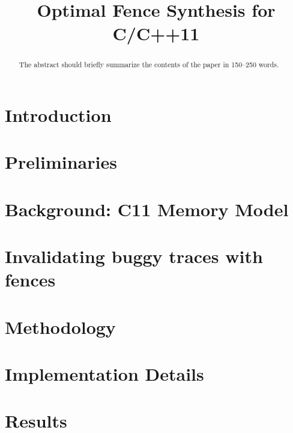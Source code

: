 \documentclass[runningheads]{llncs2e/llncs}
\begin{document}
%
\title{Optimal Fence Synthesis for C/C++11}
%
%
\maketitle              %
%
\begin{abstract}
The abstract should briefly summarize the contents of the paper in
150--250 words.

\end{abstract}
%
%
%
\section{Introduction} \label{sec:intro}


\section{Preliminaries} \label{sec:preliminaries}


\section{Background: C11 Memory Model} \label{sec:c11}


\section{Invalidating buggy traces with \cc fences} \label{sec:so theory}


\section{Methodology} \label{sec:methodology}


\section{Implementation Details} \label{sec:implementation}


\section{Results} \label{sec:results}

\end{document}
